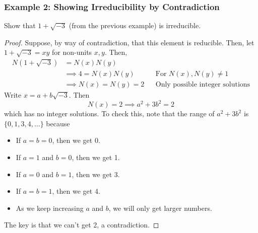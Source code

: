 \documentclass[letterpaper]{article}
\begin{document}
\subsubsection{Example 2: Showing Irreducibility by Contradiction}
Show that $1 + \sqrt{-3}$ (from the previous example) is irreducible. 

\begin{mdframed}[]
    \begin{proof}
        Suppose, by way of contradiction, that this element is reducible. Then, let $1 + \sqrt{-3} = xy$ for non-units $x, y$. Then, 
        \begin{equation*}
            \begin{aligned}
                N(1 + \sqrt{-3}) &= N(x)N(y) \\ 
                    &\implies 4 = N(x)N(y) && \text{For } N(x), N(y) \neq 1 \\ 
                    &\implies N(x) = N(y) = 2 && \text{Only possible integer solutions}
            \end{aligned}
        \end{equation*}
        Write $x = a + b\sqrt{-3}$. Then 
        \[N(x) = 2 \implies a^2 + 3b^2 = 2\]
        which has no integer solutions. To check this, note that the range of $a^2 + 3b^2$ is $\{0, 1, 3, 4, \dots\}$ because 
        \begin{itemize}
            \item If $a = b = 0$, then we get 0.
            \item If $a = 1$ and $b = 0$, then we get 1. 
            \item If $a = 0$ and $b = 1$, then we get 3. 
            \item If $a = b = 1$, then we get 4. 
            \item As we keep increasing $a$ and $b$, we will only get larger numbers. 
        \end{itemize}
        The key is that we can't get 2, a contradiction. 
    \end{proof}
\end{mdframed}
\end{document}
